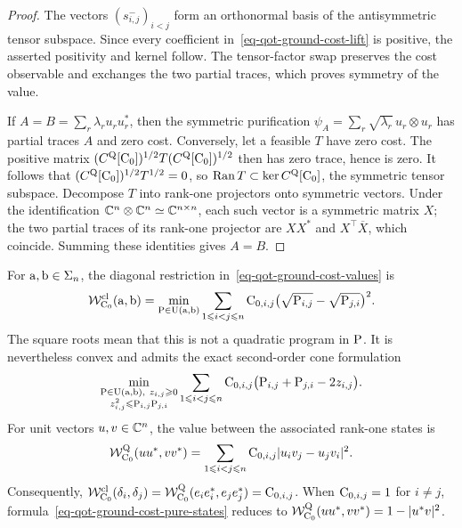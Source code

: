 \begin{proof}
	The vectors $(s_{i,j}^-)_{i<j}$ form an orthonormal basis of the antisymmetric tensor subspace. Since every coefficient in~\eqref{eq-qot-ground-cost-lift} is positive, the asserted positivity and kernel follow. The tensor-factor swap preserves the cost observable and exchanges the two partial traces, which proves symmetry of the value.

	If $A=B=\sum_r\lambda_r u_ru_r^*$, then the symmetric purification $\psi_A=\sum_r\sqrt{\lambda_r}\,u_r\otimes u_r$ has partial traces $A$ and zero cost. Conversely, let a feasible $T$ have zero cost. The positive matrix $(C^{\mathrm Q}[\C_0])^{1/2}T(C^{\mathrm Q}[\C_0])^{1/2}$ then has zero trace, hence is zero. It follows that $(C^{\mathrm Q}[\C_0])^{1/2}T^{1/2}=0$, so $\operatorname{Ran}T\subset\ker C^{\mathrm Q}[\C_0]$, the symmetric tensor subspace. Decompose $T$ into rank-one projectors onto symmetric vectors. Under the identification $\CC^n\otimes\CC^n\simeq\CC^{n\times n}$, each such vector is a symmetric matrix $X$; the two partial traces of its rank-one projector are $XX^*$ and $X^\top\overline X$, which coincide. Summing these identities gives $A=B$.
\end{proof}

\begin{prop}\label{prop-qot-classical-restriction}
	For $\a,\b\in\simplex_n$, the diagonal restriction in~\eqref{eq-qot-ground-cost-values} is
	\begin{equation}\label{eq-qot-classical-square-root-program}
		\mathcal W_{\C_0}^{\mathrm{cl}}(\a,\b)
		=
		\min_{\P\in\CouplingsD(\a,\b)}
		\sum_{1\leq i<j\leq n}
		\C_{0,i,j}\bigl(\sqrt{\P_{i,j}}-\sqrt{\P_{j,i}}\bigr)^2.
	\end{equation}
	The square roots mean that this is not a quadratic program in $\P$. It is nevertheless convex and admits the exact second-order cone formulation
	\begin{equation}\label{eq-qot-classical-socp}
		\min_{\substack{\P\in\CouplingsD(\a,\b),\ z_{i,j}\geq0\\
			z_{i,j}^2\leq\P_{i,j}\P_{j,i}}}
		\sum_{1\leq i<j\leq n}\C_{0,i,j}
		\bigl(\P_{i,j}+\P_{j,i}-2z_{i,j}\bigr).
	\end{equation}
	For unit vectors $u,v\in\CC^n$, the value between the associated rank-one states is
	\begin{equation}\label{eq-qot-ground-cost-pure-states}
		\mathcal W_{\C_0}^{\mathrm Q}(uu^*,vv^*)
		=
		\sum_{1\leq i<j\leq n}\C_{0,i,j}|u_i v_j-u_j v_i|^2.
	\end{equation}
	Consequently,
	$\mathcal W_{\C_0}^{\mathrm{cl}}(\delta_i,\delta_j)
	=\mathcal W_{\C_0}^{\mathrm Q}(e_i e_i^*,e_j e_j^*)=\C_{0,i,j}$.
	When $\C_{0,i,j}=1$ for $i\neq j$, formula~\eqref{eq-qot-ground-cost-pure-states} reduces to
	$\mathcal W_{\C_0}^{\mathrm Q}(uu^*,vv^*)=1-|u^*v|^2$.
\end{prop}

